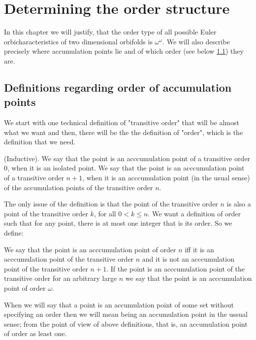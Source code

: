 \section{Determining the order structure}
In this chapter we will justify, that the order type of all possible Euler orbicharacteristics 
of two dimensional orbifolds is $\omega^\omega$. 
We will also describe precisely where accumulation points lie and of which order 
(see below \ref{accumulation_points_definitions}) they are.
\subsection{Definitions regarding order of accumulation points}
\label{accumulation_points_definitions} 
We start with one technical definition of "transitive order" that will be almost what we want
and then, there will be the the definition of "order", which is the definition that we need. \\ 
\begin{definition}
(Inductive). 
We say that the point is an acccumulation point of a transitive order $0$, when it is 
an isolated point. 
We say that the point is an acccumulation point of a transitive order $n + 1$, when it is 
an acccumulation point (in the usual sense) of the accumulation points of the transitive order $n$. 
\end{definition}  
The only issue of the definition is that the point of the transitive order $n$ is also a point 
of the transitive order $k$, for all $0< k \leq n$. We want a definition of order such that 
for any point, there is at most one integer that is its order. So we define:
\begin{definition}
We say that the point is an acccumulation point of order $n$ iff it is an acccumulation point 
of the transitive order $n$ and it is not an acccumulation point of the transitive order $n+1$. 
If the point is an acccumulation point of the transitive order for an arbitrary large $n$ we say that 
the  point is an acccumulation point of order $\omega$.
\end{definition}

When we will say that a point is an accumulation point of some set without specifying an order 
then we will mean being an accumulation point in the ussual sense; from the point of view 
of above definitions, that is, an accumulation point of order as least one.

